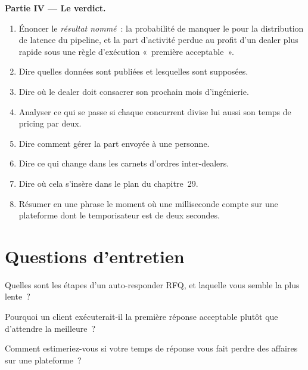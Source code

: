 \begin{problem}
\medskip\noindent\textbf{Partie IV --- Le verdict.}
\begin{enumerate}[resume]
\item Énoncer le \emph{résultat nommé}~: la probabilité de manquer le  pour la distribution de latence du pipeline, et la part
  d'activité perdue au profit d'un dealer plus rapide sous une règle d'exécution «~première acceptable~».
\item Dire quelles données sont publiées et lesquelles sont supposées.
\item Dire où le dealer doit consacrer son prochain mois d'ingénierie.
\item Analyser ce qui se passe si chaque concurrent divise lui aussi son temps de pricing par deux.
\item Dire comment gérer la part envoyée à une personne.
\item Dire ce qui change dans les carnets d'ordres inter-dealers.
\item Dire où cela s'insère dans le plan du chapitre~29.
\item Résumer en une phrase le moment où une milliseconde compte sur une plateforme dont le temporisateur est de deux secondes.
\end{enumerate}
\end{problem}

\section{Questions d'entretien}

\begin{interviewq}\label{iq:nw:fixed-income-and-rfq-platform-connectivity:1}
Quelles sont les étapes d'un auto-responder RFQ, et laquelle vous semble la plus lente~?
\end{interviewq}

\begin{interviewq}\label{iq:nw:fixed-income-and-rfq-platform-connectivity:2}
Pourquoi un client exécuterait-il la première réponse acceptable plutôt que d'attendre la meilleure~?
\end{interviewq}

\begin{interviewq}\label{iq:nw:fixed-income-and-rfq-platform-connectivity:3}
Comment estimeriez-vous si votre temps de réponse vous fait perdre des affaires sur une plateforme~?
\end{interviewq}

